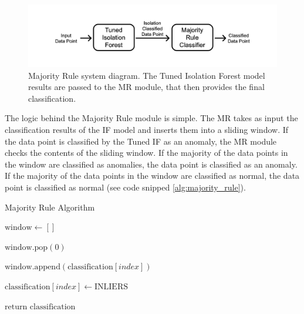 \documentclass[futureinternet,article,submit,pdftex,moreauthors]{Definitions/mdpi}
\begin{document}
\begin{figure}[H]
	\centering
	\includegraphics[width=12.5 cm]{img/ModulesStructure.jpg}
	\caption{Majority Rule system diagram. The Tuned Isolation Forest model results are passed to the MR module, that then provides the final classification.}
	\label{fig:MajorityRuleDiagram}
	\end{figure}   


The logic behind the Majority Rule module is simple. The MR takes as input the classification results of the IF model and inserts them into a sliding window. If the data point is classified by the Tuned IF as an anomaly, the MR module checks the contents of the sliding window. If the 
majority of the data points in the window are classified as anomalies, the data point is classified as an anomaly. If the majority of the data points in the window are classified as normal, the data point is classified as normal (see code snipped \ref{alg:majority_rule}).

\begin{algorithm}
	\caption{Majority Rule Algorithm}\label{alg:majority_rule}
	\begin{algorithmic}[1]
		\State \hspace{1em} $\text{window} \leftarrow []$
		
				\State \hspace{1em} $\text{window.pop}(0)$
			\EndIf
			
			\State \hspace{1em} $\text{window.append}(\text{classification}[index])$
			
				\State \hspace{1em} $\text{classification}[index] \leftarrow \text{INLIERS}$
			\EndIf
		\EndFor
		
		\State \hspace{1em} $\text{return classification}$
	\end{algorithmic}
\end{algorithm}
\end{document}
